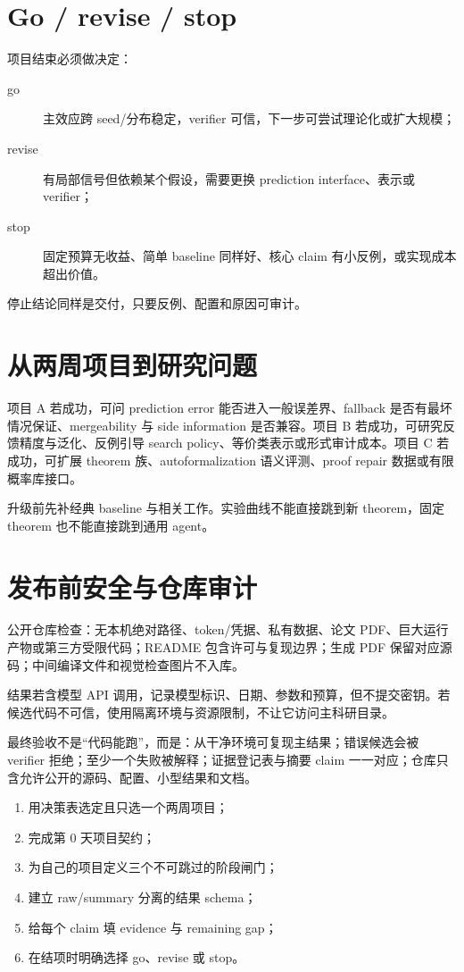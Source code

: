 \section{Go / revise / stop}

项目结束必须做决定：
\begin{description}
  \item[go] 主效应跨 seed/分布稳定，verifier 可信，下一步可尝试理论化或扩大规模；
  \item[revise] 有局部信号但依赖某个假设，需要更换 prediction interface、表示或 verifier；
  \item[stop] 固定预算无收益、简单 baseline 同样好、核心 claim 有小反例，或实现成本超出价值。
\end{description}
停止结论同样是交付，只要反例、配置和原因可审计。

\section{从两周项目到研究问题}

项目 A 若成功，可问 prediction error 能否进入一般误差界、fallback 是否有最坏情况保证、mergeability 与 side information 是否兼容。项目 B 若成功，可研究反馈精度与泛化、反例引导 search policy、等价类表示或形式审计成本。项目 C 若成功，可扩展 theorem 族、autoformalization 语义评测、proof repair 数据或有限概率库接口。

升级前先补经典 baseline 与相关工作。实验曲线不能直接跳到新 theorem，固定 theorem 也不能直接跳到通用 agent。

\section{发布前安全与仓库审计}

公开仓库检查：无本机绝对路径、token/凭据、私有数据、论文 PDF、巨大运行产物或第三方受限代码；README 包含许可与复现边界；生成 PDF 保留对应源码；中间编译文件和视觉检查图片不入库。

结果若含模型 API 调用，记录模型标识、日期、参数和预算，但不提交密钥。若候选代码不可信，使用隔离环境与资源限制，不让它访问主科研目录。

\begin{protocolbox}
最终验收不是“代码能跑”，而是：从干净环境可复现主结果；错误候选会被 verifier 拒绝；至少一个失败被解释；证据登记表与摘要 claim 一一对应；仓库只含允许公开的源码、配置、小型结果和文档。
\end{protocolbox}

\begin{checkpointbox}
\begin{enumerate}
  \item 用决策表选定且只选一个两周项目；
  \item 完成第 0 天项目契约；
  \item 为自己的项目定义三个不可跳过的阶段闸门；
  \item 建立 raw/summary 分离的结果 schema；
  \item 给每个 claim 填 evidence 与 remaining gap；
  \item 在结项时明确选择 go、revise 或 stop。
\end{enumerate}
\end{checkpointbox}
